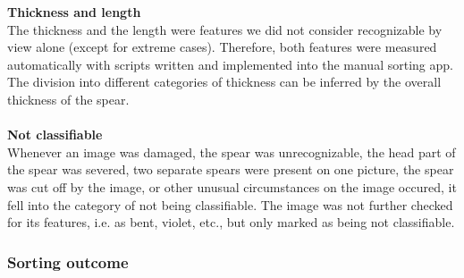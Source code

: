 \textbf{Thickness and length} \\
The thickness and the length were features we did not consider recognizable by view alone (except for extreme cases). Therefore, both features were measured automatically with scripts written and implemented into the manual sorting app. The division into different categories of thickness can be inferred by the overall thickness of the spear.\\
 \\
\textbf{Not classifiable} \\
Whenever an image was damaged, the spear was unrecognizable, the head part of the spear was severed, two separate spears were present on one picture, the spear was cut off by the image, or other unusual circumstances on the image occured, it fell into the category of not being classifiable. The image was not further checked for its features, i.e. as bent, violet, etc., but only marked as being not classifiable.



\subsubsection{Sorting outcome}
\label{subsec:SortingOutcome}

